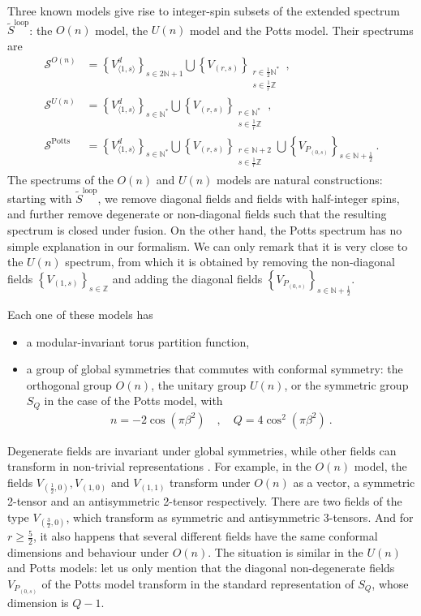 \documentclass[12pt, a4paper]{article}
\theoremstyle{break}
\begin{document}
Three known models give rise to integer-spin subsets of the extended spectrum $\widetilde{S}^\text{loop}$: the $O(n)$ model, the $U(n)$ model and the Potts model. 
Their spectrums are 
\begin{align}
\mathcal{S}^{O(n)} &= \left\{V^d_{\langle 1,s\rangle}\right\}_{s\in 2\mathbb{N}+1} \bigcup \left\{V_{(r,s)}\right\}_{\substack{r\in \frac12\mathbb{N}^*\\ s\in\frac{1}{r}\mathbb{Z}}}  \ ,
 \\
 \mathcal{S}^{U(n)} &= \left\{V^d_{\langle 1,s\rangle}\right\}_{s\in\mathbb{N}^*} \bigcup \left\{V_{(r,s)}\right\}_{\substack{r\in \mathbb{N}^*\\ s\in\frac{1}{r}\mathbb{Z}}}  \ ,
 \\
 \mathcal{S}^\text{Potts} &= \left\{V^d_{\langle 1,s\rangle}\right\}_{s\in\mathbb{N}^*} \bigcup \left\{V_{(r,s)}\right\}_{\substack{r\in \mathbb{N}+2\\ s\in\frac{1}{r}\mathbb{Z}}} \bigcup  \left\{ V_{P_{(0,s)}}\right\}_{s\in \mathbb{N}+\frac12}\ .
\end{align}
The spectrums of the $O(n)$ and $U(n)$ models are natural constructions: starting with $\widetilde{S}^\text{loop}$, we remove diagonal fields and fields with half-integer spins, and further remove degenerate or non-diagonal fields such that the resulting spectrum is closed under fusion. On the other hand, the Potts spectrum has no simple explanation in our formalism. We can only remark that it is very close to the $U(n)$ spectrum, from which it is obtained by removing the non-diagonal fields $\left\{V_{(1,s)}\right\}_{s\in\mathbb{Z}}$ and adding the diagonal fields $\left\{ V_{P_{(0,s)}}\right\}_{s\in \mathbb{N}+\frac12}$. 

Each one of these models has
\begin{itemize}
 \item a modular-invariant torus partition function,
 \item a group of global symmetries that commutes with conformal symmetry: the orthogonal group $O(n)$, the unitary group $U(n)$, or the symmetric group $S_Q$ in the case of the Potts model, with 
 \begin{align}
  n = -2\cos\left(\pi \beta^2\right) \quad , \quad Q = 4\cos^2\left(\pi \beta^2\right)\ .
  \label{nQ}
 \end{align}
\end{itemize}
Degenerate fields are invariant under global symmetries, while other fields can transform in non-trivial representations \cite{jrs22}. For example, in the $O(n)$ model, the fields $V_{(\frac12,0)},V_{(1,0)}$ and $V_{(1,1)}$ transform under $O(n)$ as a vector, a symmetric 2-tensor and an antisymmetric 2-tensor respectively. There are two fields of the type $V_{(\frac32,0)}$, which transform as symmetric and antisymmetric 3-tensors. And for $r\geq \frac52$, it also happens that several different fields have the same conformal dimensions and behaviour under $O(n)$. The situation is similar in the $U(n)$ and Potts models: let us only mention that the diagonal non-degenerate fields $V_{P_{(0,s)}}$ of the Potts model transform in the standard  representation of $S_Q$, whose dimension is $Q-1$. 
\end{document}
